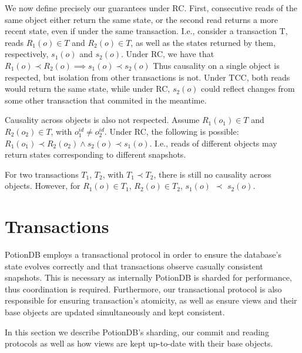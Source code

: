 \documentclass{vldb}
\begin{document}
We now define precisely our guarantees under RC.
First, consecutive reads of the same object either return the same state, or the second read returns a more recent state, even if under the same transaction.
I.e., consider a transaction T, reads $R_1(o) \in T$ and $R_2(o) \in T$, as well as the states returned by them, respectively, $s_1(o)$ and $s_2(o)$.
Under RC, we have that $R_1(o) \prec R_2(o) \implies s_1(o) \prec s_2(o)$
Thus causality on a single object is respected, but isolation from other transactions is not.
Under TCC, both reads would return the same state, while under RC, $s_2(o)$ could reflect changes from some other transaction that commited in the meantime.

Causality across objects is also not respected.
Assume $R_1(o_1) \in T$ and $R_2(o_2) \in T$, with $o_1^{id} \neq o_2^{id}$.
Under RC, the following is possible: $R_1(o_1) \prec R_2(o_2) \land s_2(o) \prec s_1(o)$.
I.e., reads of different objects may return states corresponding to different snapshots.

For two transactions $T_1$, $T_2$, with $T_1 \prec T_2$, there is still no causality across objects. However, for $R_1(o) \in T_1$, $R_2(o) \in T_2$, $s_1(o)$ $\prec$ $s_2(o)$.

\section{Transactions}
\label{sec:transactions}

PotionDB employs a transactional protocol in order to ensure the database's state evolves correctly and that transactions observe casually consistent snapshots.
This is necessary as internally PotionDB is sharded for performance, thus coordination is required.
Furthermore, our transactional protocol is also responsible for ensuring transaction's atomicity, as well as ensure views and their base objects are updated simultaneously and kept consistent.

In this section we describe PotionDB's sharding, our commit and reading protocols as well as how views are kept up-to-date with their base objects. %


\end{document}

